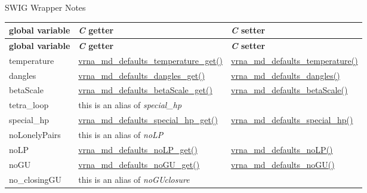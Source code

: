 \begin{DoxyRefDesc}{S\+W\+I\+G Wrapper Notes}
\tabulinesep=1mm
\begin{longtabu} spread 0pt [c]{*{3}{|X[-1]}|}
\hline
\rowcolor{\tableheadbgcolor}\textbf{ global variable }&\textbf{ {\itshape C} getter }&\textbf{ {\itshape C} setter  }\\
\endfirsthead
\hline
\endfoot
\hline
\rowcolor{\tableheadbgcolor}\textbf{ global variable }&\textbf{ {\itshape C} getter }&\textbf{ {\itshape C} setter  }\\
\endhead
temperature &\hyperlink{group__model__details_ga96b24a74437f9ba46c4e06343155bf46}{vrna\+\_\+md\+\_\+defaults\+\_\+temperature\+\_\+get()} &\hyperlink{group__model__details_gaf9e527e9a2f7e6fd6e42bc6e602f5445}{vrna\+\_\+md\+\_\+defaults\+\_\+temperature()} \\
dangles &\hyperlink{group__model__details_ga67ca06f95ae133778c79a4493c9817b8}{vrna\+\_\+md\+\_\+defaults\+\_\+dangles\+\_\+get()} &\hyperlink{group__model__details_gac76a5374def8e5e4e644ff6e4cc72dee}{vrna\+\_\+md\+\_\+defaults\+\_\+dangles()} \\
beta\+Scale &\hyperlink{group__model__details_gabb8780f5410c52f970d75b044059bd09}{vrna\+\_\+md\+\_\+defaults\+\_\+beta\+Scale\+\_\+get()} &\hyperlink{group__model__details_gae984567db36c3f9b8731ecc917abf3a2}{vrna\+\_\+md\+\_\+defaults\+\_\+beta\+Scale()} \\
tetra\+\_\+loop &this is an alias of {\itshape special\+\_\+hp} &\\
special\+\_\+hp &\hyperlink{group__model__details_ga1d68a6efdaa1253cc63fd9cd06452559}{vrna\+\_\+md\+\_\+defaults\+\_\+special\+\_\+hp\+\_\+get()} &\hyperlink{group__model__details_gafff6449a02744add0308e653230c15fc}{vrna\+\_\+md\+\_\+defaults\+\_\+special\+\_\+hp()} \\
no\+Lonely\+Pairs &this is an alias of {\itshape no\+LP} &\\
no\+LP &\hyperlink{group__model__details_ga934344888fbacaed538bbbfe910f2aa6}{vrna\+\_\+md\+\_\+defaults\+\_\+no\+L\+P\+\_\+get()} &\hyperlink{group__model__details_ga2f88ffc393ac9d7987849c965fd29ea8}{vrna\+\_\+md\+\_\+defaults\+\_\+no\+L\+P()} \\
no\+GU &\hyperlink{group__model__details_ga5faa7d4e536d7fe36ec25428c0cf2563}{vrna\+\_\+md\+\_\+defaults\+\_\+no\+G\+U\+\_\+get()} &\hyperlink{group__model__details_ga98218f85c7a957a1d1ddf4627fdf5a39}{vrna\+\_\+md\+\_\+defaults\+\_\+no\+G\+U()} \\
no\+\_\+closing\+GU &this is an alias of {\itshape no\+G\+Uclosure} &\\

\end{longtabu}
\end{DoxyRefDesc}
